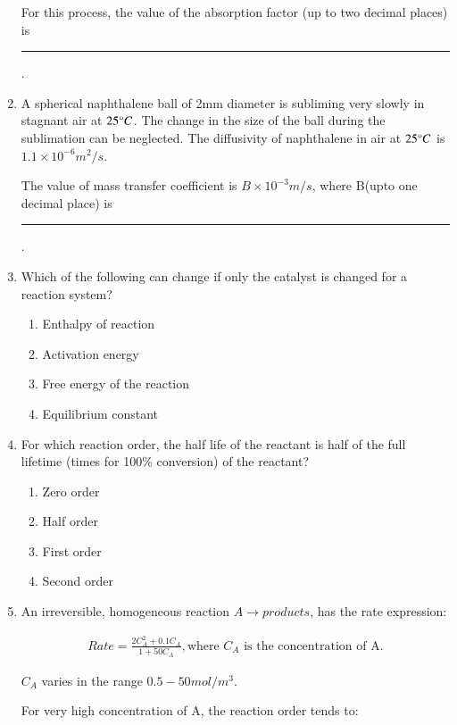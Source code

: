 \documentclass[journal,12pt,onecolumn]{IEEEtran}
\theoremstyle{remark}
\begin{document}
\begin{enumerate}
    For this process, the value of the absorption factor (up to two decimal places) is \rule{40pt}{0.1mm}.

\hfill{}
    \item A spherical naphthalene ball of 2mm diameter is subliming very slowly in stagnant air at $25\degree C$. The change in the size of the ball during the sublimation can be neglected. The diffusivity of naphthalene in air at $25\degree C$ is $1.1 \times 10^{-6} m^2/s$.

    The value of mass transfer coefficient is $B \times 10^{-3} m/s$, where B(upto one decimal place) is \rule{40pt}{0.1mm}.

\hfill{}
    \item Which of the following can change if only the catalyst is changed for a reaction system?

\hfill{}
\begin{enumerate}
    \item Enthalpy of reaction
    \item Activation energy
    \item Free energy of the reaction
    \item Equilibrium constant
\end{enumerate}

    \item For which reaction order, the half life of the reactant is half of the full lifetime (times for 100\% conversion) of the reactant?

\hfill{}
\begin{enumerate}
    \item Zero order
    \item Half order
    \item First order
    \item Second order
\end{enumerate}

    \item An irreversible, homogeneous reaction $A \to products$, has the rate expression:

\begin{align*}
    Rate = \frac{2C_{A}^{2} + 0.1 C_A}{1 + 50C_A}, \text{where $C_A$ is the concentration of A.}
\end{align*}

$C_A$ varies in the range $0.5 - 50 mol/m^3$.

For very high concentration of A, the reaction order tends to:


\end{enumerate}
\end{document}
